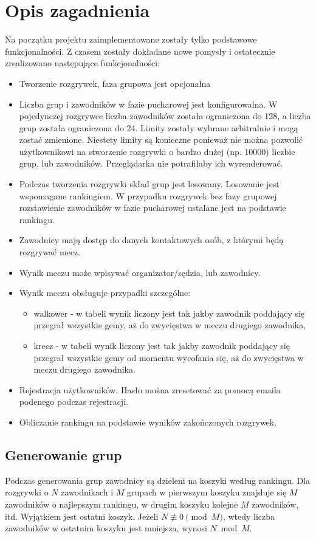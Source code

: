\documentclass[shortabstract]{iithesis}
\begin{document}
\chapter{Opis zagadnienia}
Na początku projektu zaimplementowane zostały tylko podstawowe funkcjonalności. Z czasem zostały dokładane nowe pomysły
i ostatecznie zrealizowano następujące funkcjonalności:
\begin{itemize}
    \item Tworzenie rozgrywek, faza grupowa jest opcjonalna
    \item Liczba grup i zawodników w fazie pucharowej jest konfigurowalna.
          W pojedynczej rozgrywce liczba zawodników została ograniczona do 128, a liczba grup została ograniczona do 24.
          Limity zostały wybrane arbitralnie i mogą zostać zmienione.
          Niestety limity są konieczne ponieważ nie można pozwolić użytkownikowi na stworzenie rozgrywki o bardzo dużej (np. 10000) liczbie grup, lub zawodników.
          Przeglądarka nie potrafiłaby ich wyrenderować.
    \item Podczas tworzenia rozgrywki skład grup jest losowany. Losowanie jest wspomagane rankingiem.
          W przypadku rozgrywek bez fazy grupowej rozstawienie zawodników w fazie pucharowej ustalane jest na podstawie rankingu.
    \item Zawodnicy mają dostęp do danych kontaktowych osób, z którymi będą rozgrywać mecz.
    \item Wynik meczu może wpisywać organizator/sędzia, lub zawodnicy.
    \item Wynik meczu obsługuje przypadki szczególne:
          \begin{itemize}
              \item walkower - w tabeli wynik liczony jest tak jakby zawodnik poddający się przegrał wszystkie gemy, aż do zwycięstwa w meczu drugiego zawodnika,
              \item krecz - w tabeli wynik liczony jest tak jakby zawodnik poddający się przegrał wszystkie gemy od momentu wycofania się, aż do zwycięstwa w meczu drugiego zawodnika.
          \end{itemize}
    \item Rejestracja użytkowników. Hasło można zresetować za pomocą emaila podenego podczas rejestracji.
    \item Obliczanie rankingu na podstawie wyników zakończonych rozgrywek.
\end{itemize}
\section{Generowanie grup}
Podczas generowania grup zawodnicy są dzieleni na koszyki według rankingu.
Dla rozgrywki o $N$ zawodnikach i $M$ grupach w pierwszym koszyku znajduje się $M$ zawodników o najlepszym rankingu, w drugim koszyku kolejne $M$ zawodników, itd.
Wyjątkiem jest ostatni koszyk. Jeżeli $N \not\equiv 0 \pmod{M}$, wtedy liczba zawodników w ostatnim koszyku jest mniejsza, wynosi $N\bmod{M}$.
\end{document}

